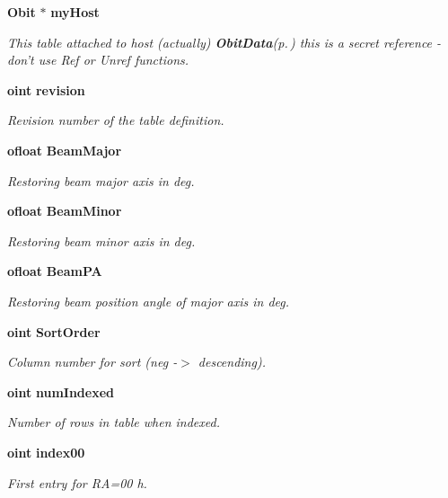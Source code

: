 \begin{CompactItemize}
{\bf Obit} $\ast$ {\bf my\-Host}
\begin{CompactList}\small\item\em This table attached to host (actually) {\bf Obit\-Data}{\rm (p.\,\pageref{structObitData})} this is a secret reference - don't use Ref or Unref functions. \item\end{CompactList}\item 
{\bf oint} {\bf revision}
\begin{CompactList}\small\item\em Revision number of the table definition. \item\end{CompactList}\item 
{\bf ofloat} {\bf Beam\-Major}
\begin{CompactList}\small\item\em Restoring beam major axis in deg. \item\end{CompactList}\item 
{\bf ofloat} {\bf Beam\-Minor}
\begin{CompactList}\small\item\em Restoring beam minor axis in deg. \item\end{CompactList}\item 
{\bf ofloat} {\bf Beam\-PA}
\begin{CompactList}\small\item\em Restoring beam position angle of major axis in deg. \item\end{CompactList}\item 
{\bf oint} {\bf Sort\-Order}
\begin{CompactList}\small\item\em Column number for sort (neg -$>$ descending). \item\end{CompactList}\item 
{\bf oint} {\bf num\-Indexed}
\begin{CompactList}\small\item\em Number of rows in table when indexed. \item\end{CompactList}\item 
{\bf oint} {\bf index00}
\begin{CompactList}\small\item\em First entry for RA=00 h. \item\end{CompactList}\item 

\end{CompactItemize}
